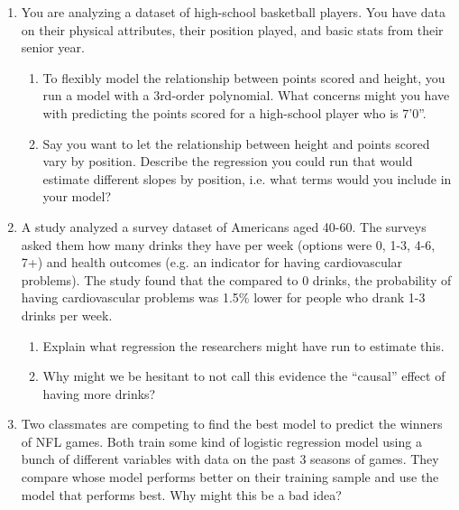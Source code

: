\documentclass[12pt]{article}
\begin{document}
\begin{enumerate}
  \newpage
  \item You are analyzing a dataset of high-school basketball players. You have data on their physical attributes, their position played, and basic stats from their senior year. 
  \begin{enumerate}
    \item To flexibly model the relationship between points scored and height, you run a model with a 3rd-order polynomial. What concerns might you have with predicting the points scored for a high-school player who is 7'0''.
    
    
    \item Say you want to let the relationship between height and points scored vary by position. Describe the regression you could run that would estimate different slopes by position, i.e. what terms would you include in your model?
  \end{enumerate}
    
  \bigskip
  \item A study analyzed a survey dataset of Americans aged 40-60. The surveys asked them how many drinks they have per week (options were 0, 1-3, 4-6, 7+) and health outcomes (e.g. an indicator for having cardiovascular problems).
  The study found that the compared to 0 drinks, the probability of having cardiovascular problems was 1.5\% lower for people who drank 1-3 drinks per week.
  \begin{enumerate}
    \item Explain what regression the researchers might have run to estimate this.
    
    \item Why might we be hesitant to not call this evidence the ``causal'' effect of having more drinks?
  \end{enumerate}

  
  \bigskip
  \item Two classmates are competing to find the best model to predict the winners of NFL games. Both train some kind of logistic regression model using a bunch of different variables with data on the past 3 seasons of games. They compare whose model performs better on their training sample and use the model that performs best. Why might this be a bad idea?


\end{enumerate}
\end{document}
